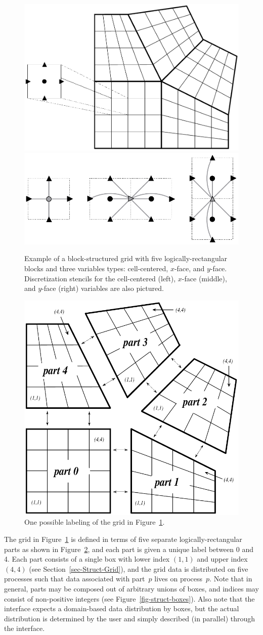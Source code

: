 \begin{figure}
\centering
\mbox{}\hfill
\includegraphics[width=.45\textwidth]{figSStructExample1a}
\hfill
\includegraphics[width=.4\textwidth]{figSStructExample1b}
\hfill\mbox{}
\caption{%
Example of a block-structured grid with five logically-rectangular blocks and
three variables types: cell-centered, $x$-face, and $y$-face.  Discretization
stencils for the cell-centered (left), $x$-face (middle), and $y$-face (right)
variables are also pictured.}
\label{fig-sstruct-example}

\end{figure}
\begin{figure}
\centering
\includegraphics[width=.6\textwidth]{figSStructExample1c}
\caption{%
One possible labeling of the grid in Figure~\ref{fig-sstruct-example}.}
\label{fig-sstruct-example-parts}
\end{figure}

The grid in Figure~\ref{fig-sstruct-example} is defined in terms of five
separate logically-rectangular parts as shown in
Figure~\ref{fig-sstruct-example-parts}, and each part is given a unique label
between 0 and 4.  Each part consists of a single box with lower index $(1,1)$
and upper index $(4,4)$ (see Section~\ref{sec-Struct-Grid}), and the grid data
is distributed on five processes such that data associated with part~$p$ lives
on process~$p$.  Note that in general, parts may be composed out of arbitrary
unions of boxes, and indices may consist of non-positive integers (see
Figure~\ref{fig-struct-boxes}).  Also note that the  interface
expects a domain-based data distribution by boxes, but the actual distribution
is determined by the user and simply described (in parallel) through the
interface.


